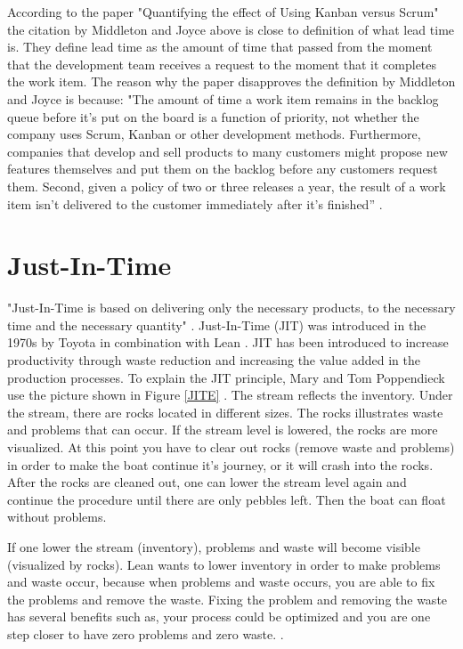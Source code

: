 \documentclass[UKenglish]{ifimaster}  %
\begin{document}
According to the paper "Quantifying the effect of Using Kanban versus Scrum" \parencite{Dag} the citation by Middleton and Joyce above is close to definition of what lead time is. They define lead time as the amount of time that passed from the moment that the development team receives a request to the moment that it completes the work item. The reason why the paper disapproves the definition by Middleton and Joyce is because: "The amount of time a work item remains in the backlog queue before it's put on the board is a function of priority, not whether the company uses Scrum, Kanban or other development methods. Furthermore, companies that develop and sell products to many customers might propose new features themselves and put them on the backlog before any customers request them. Second, given a policy of two or three releases a year, the result of a work item isn't delivered to the customer immediately after it's finished'' \parencite{Dag}.



\section{Just-In-Time}
"Just-In-Time is based on delivering only the necessary products, to the necessary time and the necessary quantity" \parencite{JIT}.
Just-In-Time (JIT) was introduced in the 1970s by Toyota in combination with Lean \parencite{javadian2013just}.  JIT has been introduced to increase productivity through waste reduction and increasing the value added in the production processes. To explain the JIT principle, Mary and Tom Poppendieck use the picture shown in Figure \ref{JITE}  \parencite{JIT} \parencite{Lean:2006}. The stream reflects the inventory.  Under the stream, there are rocks located in different sizes. The rocks illustrates waste and problems that can occur.  If the stream level is lowered, the rocks are more visualized. At this point you have to clear out rocks (remove waste and problems) in order to make the boat continue it's journey, or it will crash into the rocks. After the rocks are cleaned out, one can lower the stream level again and continue the procedure until there are only pebbles left. Then the boat can float without problems.

If one lower the stream (inventory), problems and waste will become visible (visualized by rocks). Lean wants to lower inventory in order to make problems and waste occur, because when problems and waste occurs, you are able to fix the problems and remove the waste. Fixing the problem and removing the waste has several benefits such as, your process could be optimized and you are one step closer to have zero problems and zero waste.  \parencite{JIT} \parencite{Lean:2006}.
\end{document}
